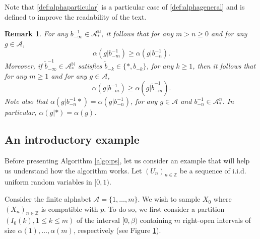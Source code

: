 \documentclass[a4paper]{article}
\newtheorem{remark}{Remark}%
\newcommand{\Z}{\mathbb{Z}}
\newcommand{\N}{\mathbb{N}}
\newcommand{\A}{\mathcal{A}}
\begin{document}
Note that \eqref{def:alphaparticular} is a particular case of \eqref{def:alphageneral} and is defined to improve the readability of the text. 


\begin{remark}\label{rem:monotone} For any $b_{-\infty}^{-1} \in \A_*^{\N}$, it follows that for any $m>n\geq 0$ and for any $g\in \A$,
$$
\alpha(g|b_{-m}^{-1})\geq \alpha(g|b_{-n}^{-1}). 
$$
Moreover, if $\tilde{b}_{-\infty}^{-1} \in \A_*^{\N}$ satisfies $\tilde{b}_{-k} \in \{*,b_{-k}\}$, for any $k\geq 1$, then it follows that for any $m\geq 1$ and for any $g\in \A$,
$$
\alpha(g|b_{-m}^{-1})\geq \alpha(g|\tilde{b}_{-m}^{-1}).
$$
Note also that $\alpha(g|b^{-1}_{-n}*)=\alpha(g|b^{-1}_{-n})$, for any $g\in \A$ and $b^{-1}_{-n} \in \A_*^n$. In particular, $\alpha(g|*)=\alpha(g)$.
\end{remark}



\subsection{An introductory example}

Before presenting Algorithm \ref{algo:ps},
let us consider an example that will help us understand how the algorithm works. Let $(U_n)_{n\in \Z}$ be a sequence of i.i.d. uniform random variables in $[0,1)$. 

Consider the finite alphabet $\A=\{1,\ldots,m\}$. We wish to sample $ X_0 $ where $(X_n)_{n\in \Z}$ is compatible with $p$. To do so, we first consider a partition $ (I_0 ( k), 1 \le k \le m )$ of the interval $[0,\beta)$ containing $m$ right-open intervals of size $\alpha(1),\ldots, \alpha(m)$, respectively (see Figure \ref{fig:1}). 

\begin{figure}[H]
\centering
{}
\caption{}
\label{fig:1}
\end{figure}
\end{document}
